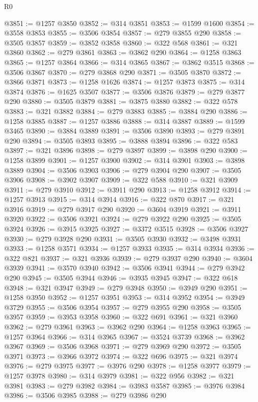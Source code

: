 \begin{lexlean}{R0}
\begin{coremodule}
@3851 := @1257 @3850
@3852 := @314 @3851
@3853 := @1599 @1600
@3854 := @3558 @3853
@3855 := @3506 @3854
@3857 := @279 @3855 @290
@3858 := @3505 @3857
@3859 := @3852 @3858
@3860 := @322 @568
@3861 := @321 @3860
@3862 := @279 @3861
@3863 := @3862 @290
@3864 := @1258 @3863
@3865 := @1257 @3864
@3866 := @314 @3865
@3867 := @3862 @3515
@3868 := @3506 @3867
@3870 := @279 @3868 @290
@3871 := @3505 @3870
@3872 := @3866 @3871
@3873 := @1258 @1626
@3874 := @1257 @3873
@3875 := @314 @3874
@3876 := @1625 @3507
@3877 := @3506 @3876
@3879 := @279 @3877 @290
@3880 := @3505 @3879
@3881 := @3875 @3880
@3882 := @322 @578
@3883 := @321 @3882
@3884 := @279 @3883
@3885 := @3884 @290
@3886 := @1258 @3885
@3887 := @1257 @3886
@3888 := @314 @3887
@3889 := @1599 @3465
@3890 := @3884 @3889
@3891 := @3506 @3890
@3893 := @279 @3891 @290
@3894 := @3505 @3893
@3895 := @3888 @3894
@3896 := @322 @583
@3897 := @321 @3896
@3898 := @279 @3897
@3899 := @3898 @290
@3900 := @1258 @3899
@3901 := @1257 @3900
@3902 := @314 @3901
@3903 := @3898 @3889
@3904 := @3506 @3903
@3906 := @279 @3904 @290
@3907 := @3505 @3906
@3908 := @3902 @3907
@3909 := @322 @588
@3910 := @321 @3909
@3911 := @279 @3910
@3912 := @3911 @290
@3913 := @1258 @3912
@3914 := @1257 @3913
@3915 := @314 @3914
@3916 := @322 @870
@3917 := @321 @3916
@3919 := @279 @3917 @290
@3920 := @3604 @3919
@3921 := @3911 @3920
@3922 := @3506 @3921
@3924 := @279 @3922 @290
@3925 := @3505 @3924
@3926 := @3915 @3925
@3927 := @3372 @3515
@3928 := @3506 @3927
@3930 := @279 @3928 @290
@3931 := @3505 @3930
@3932 := @3498 @3931
@3933 := @1258 @3571
@3934 := @1257 @3933
@3935 := @314 @3934
@3936 := @322 @821
@3937 := @321 @3936
@3939 := @279 @3937 @290
@3940 := @3604 @3939
@3941 := @3570 @3940
@3942 := @3506 @3941
@3944 := @279 @3942 @290
@3945 := @3505 @3944
@3946 := @3935 @3945
@3947 := @322 @618
@3948 := @321 @3947
@3949 := @279 @3948
@3950 := @3949 @290
@3951 := @1258 @3950
@3952 := @1257 @3951
@3953 := @314 @3952
@3954 := @3949 @3729
@3955 := @3506 @3954
@3957 := @279 @3955 @290
@3958 := @3505 @3957
@3959 := @3953 @3958
@3960 := @322 @691
@3961 := @321 @3960
@3962 := @279 @3961
@3963 := @3962 @290
@3964 := @1258 @3963
@3965 := @1257 @3964
@3966 := @314 @3965
@3967 := @3524 @3739
@3968 := @3962 @3967
@3969 := @3506 @3968
@3971 := @279 @3969 @290
@3972 := @3505 @3971
@3973 := @3966 @3972
@3974 := @322 @696
@3975 := @321 @3974
@3976 := @279 @3975
@3977 := @3976 @290
@3978 := @1258 @3977
@3979 := @1257 @3978
@3980 := @314 @3979
@3981 := @322 @956
@3982 := @321 @3981
@3983 := @279 @3982
@3984 := @3983 @3587
@3985 := @3976 @3984
@3986 := @3506 @3985
@3988 := @279 @3986 @290

\end{coremodule}
\end{lexlean}
